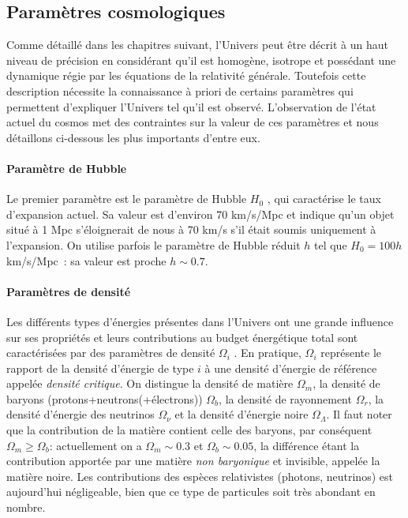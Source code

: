 \subsection{Paramètres cosmologiques}
Comme détaillé dans les chapitres suivant, l'Univers peut être décrit à un haut niveau de précision en considérant qu'il est homogène, isotrope et possédant une dynamique régie par les équations de la relativité générale. Toutefois cette description nécessite la connaissance à priori de certains paramètres qui permettent d'expliquer l'Univers tel qu'il est observé. L'observation de l'état actuel du cosmos met des contraintes sur la valeur de ces paramètres et nous détaillons ci-dessous les plus importants d'entre eux.

\paragraph{Paramètre de Hubble} Le premier paramètre est le paramètre de Hubble $H_0$ , qui caractérise le taux d'expansion actuel. Sa valeur est d'environ 70 km/s/Mpc et indique qu'un objet situé à 1 Mpc s'éloignerait de nous à 70 km/s s'il était soumis uniquement à l'expansion. On utilise parfois le paramètre de Hubble réduit $h$ tel que $H_0=100 h$ km/s/Mpc~: sa valeur est proche $h\sim 0.7$.

\paragraph{Paramètres de densité} Les différents types d'énergies présentes dans l'Univers ont une grande influence sur ses propriétés et leurs contributions au budget énergétique total sont caractérisées par des paramètres de densité $\Omega_i$ . En pratique, $\Omega_i$ représente le rapport de la densité d'énergie de type $i$ à une densité d'énergie de référence appelée \textit{densité critique}. On distingue la densité de matière $\Omega_m$, la densité de baryons (protons+neutrons(+électrons)) $\Omega_b$, la densité de rayonnement $\Omega_r$, la densité d'énergie des neutrinos $\Omega_\nu$ et la densité d'énergie noire $\Omega_\Lambda$. Il faut noter que la contribution de la matière contient celle des baryons, par conséquent $\Omega_m\ge\Omega_b$: actuellement on a $\Omega_m\sim 0.3$ et $\Omega_b\sim 0.05$, la différence étant la contribution apportée par une matière \textit{non baryonique} et invisible, appelée la matière noire. Les contributions des espèces relativistes (photons, neutrinos) est aujourd'hui négligeable, bien que ce type de particules soit très abondant en nombre.

